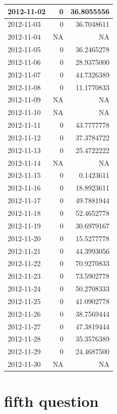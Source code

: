 \documentclass[
]{article}
\begin{document}
\begin{table}
\begin{tabular}[t]{l|r|r}
\hline
2012-11-02 & 0 & 36.8055556\\
\hline
2012-11-03 & 0 & 36.7048611\\
\hline
2012-11-04 & NA & NA\\
\hline
2012-11-05 & 0 & 36.2465278\\
\hline
2012-11-06 & 0 & 28.9375000\\
\hline
2012-11-07 & 0 & 44.7326389\\
\hline
2012-11-08 & 0 & 11.1770833\\
\hline
2012-11-09 & NA & NA\\
\hline
2012-11-10 & NA & NA\\
\hline
2012-11-11 & 0 & 43.7777778\\
\hline
2012-11-12 & 0 & 37.3784722\\
\hline
2012-11-13 & 0 & 25.4722222\\
\hline
2012-11-14 & NA & NA\\
\hline
2012-11-15 & 0 & 0.1423611\\
\hline
2012-11-16 & 0 & 18.8923611\\
\hline
2012-11-17 & 0 & 49.7881944\\
\hline
2012-11-18 & 0 & 52.4652778\\
\hline
2012-11-19 & 0 & 30.6979167\\
\hline
2012-11-20 & 0 & 15.5277778\\
\hline
2012-11-21 & 0 & 44.3993056\\
\hline
2012-11-22 & 0 & 70.9270833\\
\hline
2012-11-23 & 0 & 73.5902778\\
\hline
2012-11-24 & 0 & 50.2708333\\
\hline
2012-11-25 & 0 & 41.0902778\\
\hline
2012-11-26 & 0 & 38.7569444\\
\hline
2012-11-27 & 0 & 47.3819444\\
\hline
2012-11-28 & 0 & 35.3576389\\
\hline
2012-11-29 & 0 & 24.4687500\\
\hline
2012-11-30 & NA & NA\\
\hline
\end{tabular}
\end{table}

\hypertarget{fifth-question}{%
\section{fifth question}\label{fifth-question}}
\end{document}
